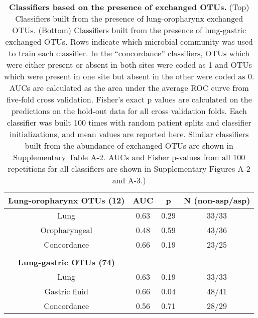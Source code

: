 \begin{table}[H]
\begin{center}

\begin{tabular}{cccc}
\textbf{Lung-oropharynx OTUs (12)} & AUC & p & N (non-asp/asp) \\
\toprule
Lung & 0.63 & 0.29 & 33/33 \\
Oropharyngeal & 0.48 & 0.59 & 43/36 \\
Concordance & 0.66 & 0.19 & 23/25 \\
\bottomrule
\\

\textbf{Lung-gastric OTUs (74)} & & & \\
\toprule
Lung & 0.63 & 0.19 & 33/33 \\
Gastric fluid & 0.66 & 0.04 & 48/41 \\
Concordance & 0.56 & 0.71 & 28/29 \\
\bottomrule
\end{tabular}

\caption{\textbf{Classifiers based on the presence of exchanged OTUs.} (Top) Classifiers built from the presence of lung-oropharynx exchanged OTUs. (Bottom) Classifiers built from the presence of lung-gastric exchanged OTUs. Rows indicate which microbial community was used to train each classifier. In the ``concordance'' classifiers, OTUs which were either present or absent in both sites were coded as 1 and OTUs which were present in one site but absent in the other were coded as 0. AUCs are calculated as the area under the average ROC curve from five-fold cross validation. Fisher's exact p values are calculated on the predictions on the hold-out data for all cross validation folds. Each classifier was built 100 times with random patient splits and classifier initializations, and mean values are reported here. Similar classifiers built from the abundance of exchanged OTUs are shown in Supplementary Table A-2. AUCs and Fisher p-values from all 100 repetitions for all classifiers are shown in Supplementary Figures A-2 and A-3.) }\label{tab5}
\end{center}
\end{table}

